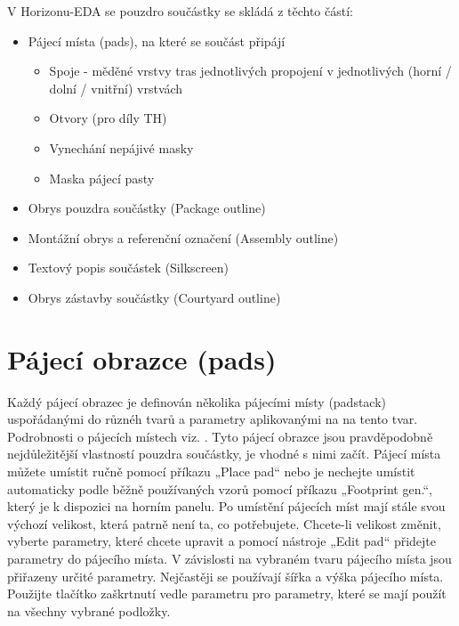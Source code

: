 \documentclass[letterpaper,10pt,czech]{sphinxmanual}
\begin{document}
V Horizonu-EDA se pouzdro součástky se skládá z těchto částí:
\begin{itemize}
\item {} 
Pájecí místa (pads), na které se součást připájí
\begin{itemize}
\item {} 
Spoje - měděné vrstvy tras jednotlivých propojení v jednotlivých (horní / dolní / vnitřní) vrstvách

\item {} 
Otvory (pro díly TH)

\item {} 
Vynechání nepájivé masky

\item {} 
Maska pájecí pasty

\end{itemize}

\item {} 
Obrys pouzdra součástky (Package outline)

\item {} 
Montážní obrys a referenční označení (Assembly outline)

\item {} 
Textový popis součástek (Silkscreen)

\item {} 
Obrys zástavby součástky (Courtyard outline)

\end{itemize}


\section{Pájecí obrazce (pads)}
\label{\detokenize{create-package:pajeci-obrazce-pads}}
Každý pájecí obrazec je definován několika pájecími místy (padstack) uspořádanými do různéh tvarů a parametry aplikovanými na na tento tvar. Podrobnosti o pájecích místech viz.
. Tyto pájecí obrazce jsou pravděpodobně nejdůležitější vlastností pouzdra součástky, je vhodné s nimi začít. Pájecí místa můžete umístit ručně pomocí příkazu „Place pad“ nebo je nechejte umístit automaticky podle běžně používaných vzorů pomocí příkazu „Footprint gen.“, který je k dispozici na horním panelu. Po umístění pájecích míst mají stále svou výchozí velikost, která patrně není ta, co potřebujete. Chcete-li velikost změnit, vyberte parametry, které chcete upravit a pomocí nástroje „Edit pad“ přidejte parametry do pájecího místa. V závislosti na vybraném tvaru pájecího místa jsou přiřazeny určité parametry. Nejčastěji se používají šířka a výška pájecího místa. Použijte tlačítko zaškrtnutí vedle parametru pro parametry, které se mají použít na všechny vybrané podložky.
\end{document}
